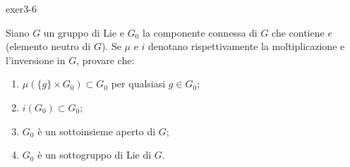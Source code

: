 
{exer3-6}
{
Siano $ G $ un gruppo di Lie e $ G_{0} $ la componente connessa di $ G $ che contiene $ e $ (elemento neutro di $ G $). Se $ \mu $ e $ i $ denotano rispettivamente la moltiplicazione e l'inversione in $ G $, provare che:

\begin{enumerate}
	\item $ \mu(\{g\} \times G_{0}) \subset G_{0} $ per qualsiasi $ g \in G_{0} $;
	
	\item $ i(G_{0}) \subset G_{0} $;
	
	\item $ G_{0} $ è un sottoinsieme aperto di $ G $;
	
	\item $ G_{0} $ è un sottogruppo di Lie di $ G $.
\end{enumerate}
}
